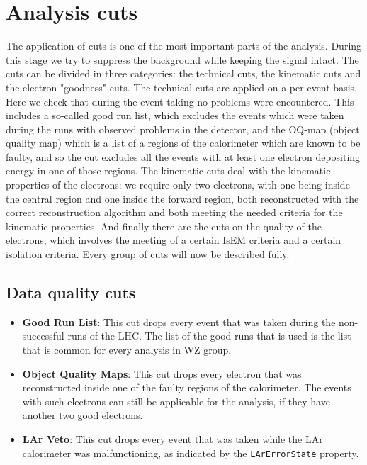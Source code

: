 \section{Analysis cuts}
\label{sec:Sel_cuts}

The application of cuts is one of the most important parts of the analysis. During this stage we try to suppress the background while keeping the signal intact. The cuts can be divided in three categories: the technical cuts, the kinematic cuts and the electron "goodness" cuts. The technical cuts are applied on a per-event basis. Here we check that during the event taking no problems were encountered. This includes a so-called good run list, which excludes the events which were taken during the runs with observed problems in the detector, and the OQ-map (object quality map) which is a list of a regions of the calorimeter which are known to be faulty, and so the cut excludes all the events with at least one electron depositing energy in one of those regions. The kinematic cuts deal with the kinematic properties of the electrons: we require only two electrons, with one being inside the central region and one inside the forward region, both reconstructed with the correct reconstruction algorithm and both meeting the needed criteria for the kinematic properties. And finally there are the cuts on the quality of the electrons, which involves the meeting of a certain IsEM criteria and a certain isolation criteria. Every group of cuts will now be described fully.

\subsection{Data quality cuts}
\label{sec:Sel_GRL_OQ}

\begin{itemize}
\item {\bfseries Good Run List}: This cut drops every event that was taken during the non-successful runs of the LHC. The list of the good runs that is used is the list that is common for every analysis in WZ group.
\item {\bfseries Object Quality Maps}: This cut drops every electron that was reconstructed inside one of the faulty regions of the calorimeter. The events with such electrons can still be applicable for the analysis, if they have another two good electrons.
\item {\bfseries LAr Veto}: This cut drops every event that was taken while the LAr calorimeter was malfunctioning, as indicated by the \texttt{LArErrorState} property.
\end{itemize}

